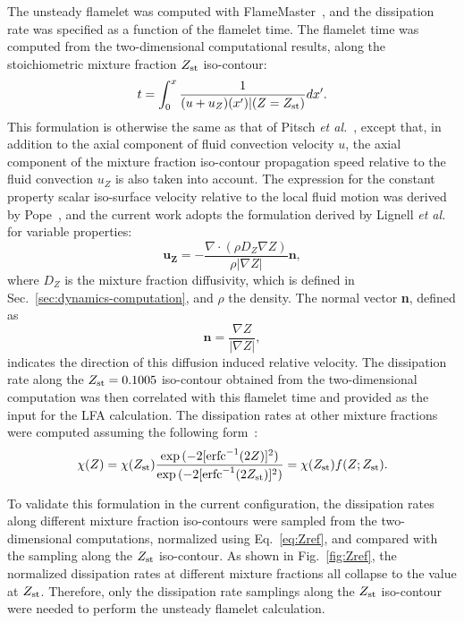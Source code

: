 The unsteady flamelet was computed with FlameMaster~\cite{flamemaster}, and the dissipation rate was specified as a function of the flamelet time.  The flamelet time was computed from the two-dimensional computational results, along the stoichiometric mixture fraction $Z_{\rm st}$ iso-contour: 
 \begin{equation} \label{eq:t}
t = \int ^{x}_{0} \frac{1}{(u + u_Z)(x')|(Z=Z_{\rm st})} dx'.
\end{equation}
This formulation is otherwise the same as that of Pitsch \emph {et al.}~\cite{pitsch98a}, except that, in addition to the axial component of fluid convection velocity $u$, the axial component of the mixture fraction iso-contour propagation speed relative to the fluid convection $u_Z$ is also taken into account.  The expression for the constant property scalar iso-surface velocity relative to the local fluid motion was derived by Pope~\cite{pope88}, and the current work adopts the formulation derived by Lignell \emph {et al.}~\cite{lignell07} for variable properties:
\begin{equation}
\mathbf{u_Z} = -\frac{\nabla \cdot (\rho D_Z \nabla Z) }{\rho |\nabla Z|} \mathbf{n},
\end{equation}  
where $D_Z$ is the mixture fraction diffusivity, which is defined in Sec.~\ref{sec:dynamics-computation}, and $\rho$ the density.  The normal vector \textbf{n}, defined as
\begin{equation}
\mathbf{n} = \frac{\nabla Z}{|\nabla Z|},
\end{equation}
indicates the direction of this diffusion induced relative velocity.
The dissipation rate along the $Z_{\rm st} = 0.1005$ iso-contour obtained from the two-dimensional computation was then correlated with this flamelet time and provided as the input for the LFA calculation.  The dissipation rates at other mixture fractions were computed assuming the following form~\cite{petersbook}:
\begin{equation} \label{eq:Zref}
\chi{(Z)} = \chi{(Z_{\rm st})} \frac{\exp{(-2[{\rm erfc}^{-1}(2Z)]^2)}}{\exp{(-2[{\rm erfc}^{-1}(2Z_{\rm st})]^2)}} = \chi{(Z_{\rm st})} f(Z;Z_{\rm st}).
\end{equation}

To validate this formulation in the current configuration, the dissipation rates along different mixture fraction iso-contours were sampled from the two-dimensional computations, normalized using Eq.~\ref{eq:Zref}, and compared with the sampling along the $Z_{\rm st}$ iso-contour.  As shown in Fig.~\ref{fig:Zref}, the normalized dissipation rates at different mixture fractions all collapse to the value at $Z_{\rm st}$.  Therefore, only the dissipation rate samplings along the $Z_{\rm st}$ iso-contour were needed to perform the unsteady flamelet calculation.

